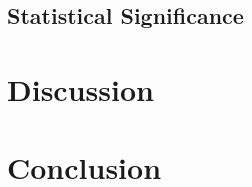 \documentclass[journal]{IEEEtran}
\begin{document}
\subsection{Statistical Significance}

\section{Discussion}
\label{sec:discussion}


\section{Conclusion}
\label{sec:conclusion}




\end{document}
